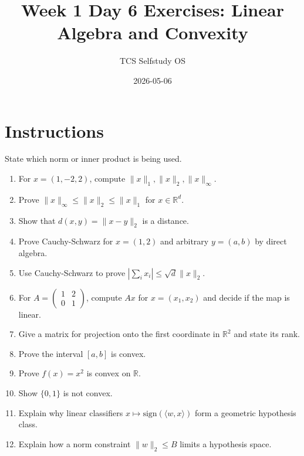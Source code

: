 \documentclass[11pt]{article}
\title{Week 1 Day 6 Exercises: Linear Algebra and Convexity}
\author{TCS Selfstudy OS}
\date{2026-05-06}
\begin{document}
\maketitle

\section*{Instructions}
State which norm or inner product is being used.

\begin{enumerate}[label=\textbf{D6.\arabic*.}]
\item For $x=(1,-2,2)$, compute $\|x\|_1,\|x\|_2,\|x\|_\infty$.
\item Prove $\|x\|_\infty\le \|x\|_2\le \|x\|_1$ for $x\in\mathbb{R}^d$.
\item Show that $d(x,y)=\|x-y\|_2$ is a distance.
\item Prove Cauchy-Schwarz for $x=(1,2)$ and arbitrary $y=(a,b)$ by direct algebra.
\item Use Cauchy-Schwarz to prove $|\sum_i x_i|\le \sqrt{d}\|x\|_2$.
\item For $A=\begin{pmatrix}1&2\\0&1\end{pmatrix}$, compute $Ax$ for $x=(x_1,x_2)$ and decide if the map is linear.
\item Give a matrix for projection onto the first coordinate in $\mathbb{R}^2$ and state its rank.
\item Prove the interval $[a,b]$ is convex.
\item Prove $f(x)=x^2$ is convex on $\mathbb{R}$.
\item Show $\{0,1\}$ is not convex.
\item Explain why linear classifiers $x\mapsto \mathrm{sign}(\langle w,x\rangle)$ form a geometric hypothesis class.
\item Explain how a norm constraint $\|w\|_2\le B$ limits a hypothesis space.
\end{enumerate}
\end{document}
